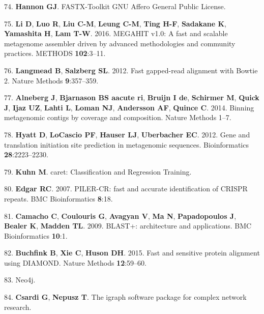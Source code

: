 \documentclass[12pt,]{article}
\begin{document}
\hypertarget{ref-FASTXToolkit:wr}{}
74. \textbf{Hannon GJ}. FASTX-Toolkit GNU Affero General Public License.

\hypertarget{ref-Li:2016kd}{}
75. \textbf{Li D}, \textbf{Luo R}, \textbf{Liu C-M}, \textbf{Leung C-M},
\textbf{Ting H-F}, \textbf{Sadakane K}, \textbf{Yamashita H},
\textbf{Lam T-W}. 2016. MEGAHIT v1.0: A fast and scalable metagenome
assembler driven by advanced methodologies and community practices.
METHODS \textbf{102}:3--11.

\hypertarget{ref-Langmead:2012jh}{}
76. \textbf{Langmead B}, \textbf{Salzberg SL}. 2012. Fast gapped-read
alignment with Bowtie 2. Nature Methods \textbf{9}:357--359.

\hypertarget{ref-Alneberg:2014fc}{}
77. \textbf{Alneberg J}, \textbf{Bjarnason BS aacute ri}, \textbf{Bruijn
I de}, \textbf{Schirmer M}, \textbf{Quick J}, \textbf{Ijaz UZ},
\textbf{Lahti L}, \textbf{Loman NJ}, \textbf{Andersson AF},
\textbf{Quince C}. 2014. Binning metagenomic contigs by coverage and
composition. Nature Methods 1--7.

\hypertarget{ref-Hyatt:2012cy}{}
78. \textbf{Hyatt D}, \textbf{LoCascio PF}, \textbf{Hauser LJ},
\textbf{Uberbacher EC}. 2012. Gene and translation initiation site
prediction in metagenomic sequences. Bioinformatics
\textbf{28}:2223--2230.

\hypertarget{ref-caretClassificatio:ux5fU2Litux5f1}{}
79. \textbf{Kuhn M}. caret: Classification and Regression Training.

\hypertarget{ref-Edgar:2007bh}{}
80. \textbf{Edgar RC}. 2007. PILER-CR: fast and accurate identification
of CRISPR repeats. BMC Bioinformatics \textbf{8}:18.

\hypertarget{ref-Camacho:2009fc}{}
81. \textbf{Camacho C}, \textbf{Coulouris G}, \textbf{Avagyan V},
\textbf{Ma N}, \textbf{Papadopoulos J}, \textbf{Bealer K},
\textbf{Madden TL}. 2009. BLAST+: architecture and applications. BMC
Bioinformatics \textbf{10}:1.

\hypertarget{ref-Buchfink:2015ki}{}
82. \textbf{Buchfink B}, \textbf{Xie C}, \textbf{Huson DH}. 2015. Fast
and sensitive protein alignment using DIAMOND. Nature Methods
\textbf{12}:59--60.

\hypertarget{ref-Neoj:Fuwr6PBN}{}
83. Neo4j.

\hypertarget{ref-Theigraphsoftware:vh}{}
84. \textbf{Csardi G}, \textbf{Nepusz T}. The igraph software package
for complex network research.
\end{document}
